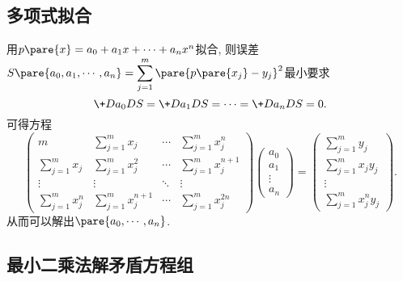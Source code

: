 \documentclass[hidelinks]{ctexart}
\begin{document}

\subsection{多项式拟合} %
\label{sub:多项式拟合}

用$p\pare{x} = a_0+a_1x+\cdots+a_nx^n$拟合, 则误差$\displaystyle S\pare{a_0,a_1,\cdots,a_n} = \sum_{j=1}^m \pare{p\pare{x_j} - y_j}^2$最小要求
\[ \+D{a_0}DS = \+D{a_1}DS = \cdots = \+D{a_n}DS = 0. \]
可得方程
\[ \begin{pmatrix}
    \displaystyle m & \displaystyle \sum_{j=1}^m x_j & \cdots & \displaystyle \sum_{j=1}^m x_j^n \\
    \displaystyle \sum_{j=1}^m x_j & \displaystyle \sum_{j=1}^m x_j^2 & \cdots & \displaystyle \sum_{j=1}^m x_j^{n+1} \\
    \vdots & \vdots & \ddots & \vdots \\
    \displaystyle \sum_{j=1}^m x_j^n & \displaystyle \sum_{j=1}^m x_j^{n+1} & \cdots & \displaystyle \sum_{j=1}^m x_j^{2n}
\end{pmatrix} \begin{pmatrix}
    a_0 \\ a_1 \\ \vdots \\ a_n
\end{pmatrix} = \begin{pmatrix}
    \displaystyle \sum_{j=1}^m y_j \\
    \displaystyle \sum_{j=1}^m x_jy_j \\
    \vdots \\
    \displaystyle \sum_{j=1}^m x_j^ny_j
\end{pmatrix}. \]
从而可以解出$\pare{a_0,\cdots,a_n}$.


\subsection{最小二乘法解矛盾方程组} %
\label{sub:最小二乘法解矛盾方程组}
\end{document}
